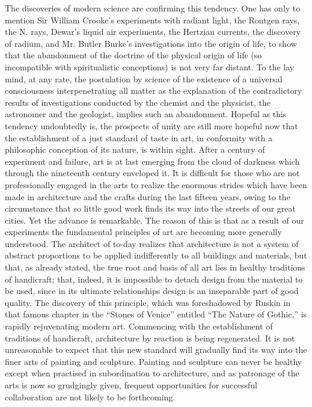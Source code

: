 \documentclass{book}
\begin{document}
The discoveries of modern science are confirming this tendency. One has only to mention Sir William Crooke’s experiments with radiant light, the Rontgen rays, the N. rays, Dewar’s liquid air experiments, the Hertzian currents, the discovery of radium, and Mr. Butler Burke’s investigations into the origin of life, to show that the abandonment of the doctrine of the physical origin of life (so incompatible with spiritualistic conceptions) is not very far distant. To the lay mind, at any rate, the postulation by science of the existence of a universal consciousness interpenetrating all matter as the explanation of the contradictory results of investigations conducted by the chemist and the physicist, the astronomer and the geologist, implies such an abandonment. Hopeful as this tendency undoubtedly is, the prospects of unity are still more hopeful now that the establishment of a just standard of taste in art, in conformity with a philosophic conception of its nature, is within sight. After a century of experiment and failure, art is at last emerging from the cloud of darkness which through the nineteenth century enveloped it. It is difficult for those who are not professionally engaged in the arts to realize the enormous strides which have been made in architecture and the crafts during the last fifteen years, owing to the circumstance that so little good work finds its way into the streets of our great cities. Yet the advance is remarkable. The reason of this is that as a result of our experiments the fundamental principles of art are becoming more generally understood. The architect of to-day realizes that architecture is not a system of abstract proportions to be applied indifferently to all buildings and materials, but that, as already stated, the true root and basis of all art lies in healthy traditions of handicraft; that, indeed, it is impossible to detach design from the material to be used, since in its ultimate relationships design is an inseparable part of good quality. The discovery of this principle, which was foreshadowed by Ruskin in that famous chapter in the “Stones of Venice” entitled “The Nature of Gothic,” is rapidly rejuvenating modern art. Commencing with the establishment of traditions of handicraft, architecture by reaction is being regenerated. It is not unreasonable to expect that this new standard will gradually find its way into the finer arts of painting and sculpture. Painting and sculpture can never be healthy except when practised in subordination to architecture, and as patronage of the arts is now so grudgingly given, frequent opportunities for successful collaboration are not likely to be forthcoming.
\end{document}
